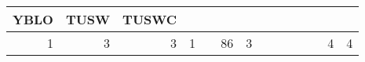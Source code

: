 \documentclass[]{article}
\begin{document}
{\begin{longtable}[]{@{}rrrrrrrrrrrrrr@{}}
\begin{minipage}[b]{0.04\columnwidth}
YBLO\strut
\end{minipage} & \begin{minipage}[b]{0.04\columnwidth}\raggedleft\strut
TUSW\strut
\end{minipage} & \begin{minipage}[b]{0.04\columnwidth}\raggedleft\strut
TUSWC\strut
\end{minipage}\tabularnewline
\midrule
\endhead
\begin{minipage}[t]{0.05\columnwidth}\raggedleft\strut
1\strut
\end{minipage} & \begin{minipage}[t]{0.05\columnwidth}\raggedleft\strut
3\strut
\end{minipage} & \begin{minipage}[t]{0.05\columnwidth}\raggedleft\strut
3\strut
\end{minipage} & \begin{minipage}[t]{0.04\columnwidth}\raggedleft\strut
1\strut
\end{minipage} & \begin{minipage}[t]{0.05\columnwidth}\raggedleft\strut
\strut
\end{minipage} & \begin{minipage}[t]{0.05\columnwidth}\raggedleft\strut
86\strut
\end{minipage} & \begin{minipage}[t]{0.05\columnwidth}\raggedleft\strut
3\strut
\end{minipage} & \begin{minipage}[t]{0.04\columnwidth}\raggedleft\strut
\strut
\end{minipage} & \begin{minipage}[t]{0.05\columnwidth}\raggedleft\strut
\strut
\end{minipage} & \begin{minipage}[t]{0.04\columnwidth}\raggedleft\strut
\strut
\end{minipage} & \begin{minipage}[t]{0.04\columnwidth}\raggedleft\strut
\strut
\end{minipage} & \begin{minipage}[t]{0.04\columnwidth}\raggedleft\strut
\strut
\end{minipage} & \begin{minipage}[t]{0.04\columnwidth}\raggedleft\strut
4\strut
\end{minipage} & \begin{minipage}[t]{0.04\columnwidth}\raggedleft\strut
4\strut

\end{minipage}
\end{longtable}}
\end{document}
